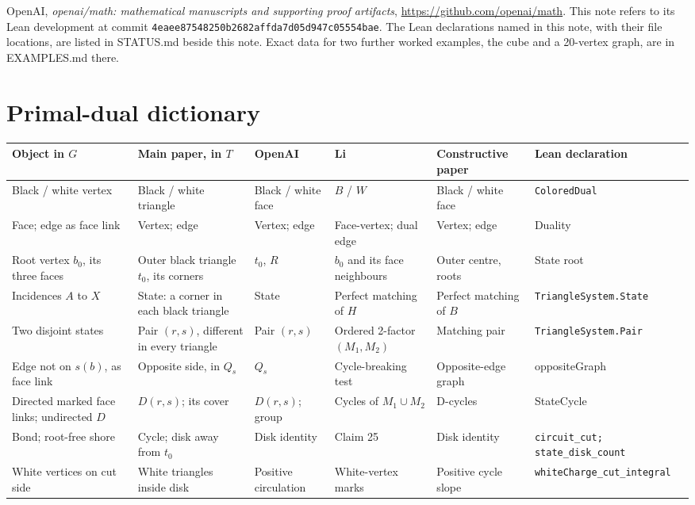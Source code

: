 \documentclass[a4paper,11pt]{amsart}
\begin{document}
OpenAI, \emph{openai/math: mathematical manuscripts and supporting proof artifacts}, \url{https://github.com/openai/math}. This note refers to its Lean development at commit \nolinkurl{4eaee87548250b2682affda7d05d947c05554bae}. The Lean declarations named in this note, with their file locations, are listed in STATUS.md beside this note. Exact data for two further worked examples, the cube and a 20-vertex graph, are in EXAMPLES.md there.
\clearpage\section*{Primal-dual dictionary}
\begingroup\footnotesize\setlength{\tabcolsep}{3pt}\renewcommand{\arraystretch}{1.35}
\noindent\begin{tabularx}{\textwidth}{@{}*{6}{>{\raggedright\arraybackslash}X}@{}}\toprule
Object in $G$ & Main paper, in $T$ & OpenAI & Li & Constructive paper & Lean declaration\\\midrule
Black / white vertex & Black / white triangle & Black / white face & $B$ / $W$ & Black / white face & \nolinkurl{ColoredDual}\\
Face; edge as face link & Vertex; edge & Vertex; edge & Face-vertex; dual edge & Vertex; edge & Duality\\
Root vertex $b_0$, its three faces & Outer black triangle $t_0$, its corners & $t_0$, $R$ & $b_0$ and its face neighbours & Outer centre, roots & State root\\
Incidences $A$ to $X$ & State: a corner in each black triangle & State & Perfect matching of $H$ & Perfect matching of $B$ & \nolinkurl{TriangleSystem.State}\\
Two disjoint states & Pair $(r,s)$, different in every triangle & Pair $(r,s)$ & Ordered 2-factor $(M_1,M_2)$ & Matching pair & \nolinkurl{TriangleSystem.Pair}\\
Edge not on $s(b)$, as face link & Opposite side, in $Q_s$ & $Q_s$ & Cycle-breaking test & Opposite-edge graph & oppositeGraph\\
Directed marked face links; undirected $D$ & $D(r,s)$; its cover & $D(r,s)$; group & Cycles of $M_1\cup M_2$ & D-cycles & StateCycle\\
Bond; root-free shore & Cycle; disk away from $t_0$ & Disk identity & Claim 25 & Disk identity & \nolinkurl{circuit_cut; state_disk_count}\\
White vertices on cut side & White triangles inside disk & Positive circulation & White-vertex marks & Positive cycle slope & \nolinkurl{whiteCharge_cut_integral}\\

\end{tabularx}
\end{document}
